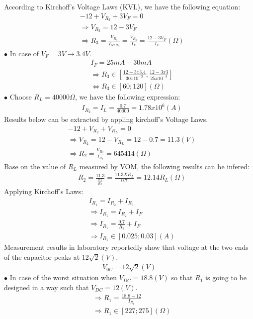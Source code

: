 \documentclass[12pt]{extarticle}
\newcommand{\<}{\langle}
\renewcommand{\>}{\rangle}
\theoremstyle{definition}
\begin{document}
\begin{normalsize}
According to Kirchoff's Voltage Laws (KVL), we have the following equation:
\begin{align*}
&-12 + V_{R_3} + 3V_F = 0\\
&\Longrightarrow V_{R_3} = 12 - 3V_F\\
&\Longrightarrow R_3 = \frac{V_{R_3}}{I_{sccR_3}} = \frac{V_{R_3}}{I_F} = \frac{12 - 3V_F}{I_F}(\Omega)
\end{align*}
$\bullet$ In case of $V_F  = 3V \longrightarrow 3.4V$.
\begin{align*}
&I_F = 25mA - 30mA\\
&\Longrightarrow R_3 \in \left[\frac{12 - 3x3.4}{30x10^{-3}} ; \frac{12 - 3x3}{25x10^{-3}}\right]\\
&\iff R_3 \in [60 ; 120] (\Omega)
\end{align*}
$\bullet$ Choose $R_L = 40000\Omega$, we have the following expression:
\begin{align*}
&I_{R_2} = I_L = \frac{0.7}{40000} = 1.78x10^6(A)
\end{align*}
Results below can be extracted by appling kirchoff's Voltage Laws. 
\begin{align*}
&-12 + V_{R_2} + V_{R_L} = 0\\
&\Longrightarrow V_{R_2} = 12 - V_{R_L} = 12 - 0.7 = 11.3(V)\\
&\Longrightarrow R_2 = \frac{V_{R_2}}{I_{R_2}} = 645414 (\Omega)
\end{align*}
Base on the value of $R_L$ measured by VOM, the following results can be infered:
\begin{align*}
&R_2 = \frac{11.3}{\frac{0.7}{R_L}} = \frac{11.3 X R_L}{0.7} = 12.14R_L (\Omega)
\end{align*}
Applying Kirchoff's Laws:
\begin{align*}
&I_{R_1} = I_{R_2} + I_{R_3}\\
&\Longrightarrow I_{R_1} = I_{R_2} + I_F\\
&\Longrightarrow I_{R_1} = \frac{0.7}{R_2} + I_F\\
&\Longrightarrow I_{R_1} \in [0.025 ; 0.03] (A)
\end{align*}
Measurement results in laboratory reportedly show that voltage at the two ends of the capacitor peaks at $12\sqrt{2} (V)$.
\begin{align*}
V_{0C} = 12\sqrt{2} (V)
\end{align*}
$\bullet$ In case of the worst situation when $V_{DC} = 18.8(V)$ so that $R_1$ is going to be designed in a way such that $V_{DC} = 12 (V)$.
\begin{align*}
&\Longrightarrow R_1 = \frac{18.8 - 12}{I_{R_1}}\\
&\Longrightarrow R_1 \in [227 ; 275](\Omega)
\end{align*}

\end{normalsize}
\end{document}
